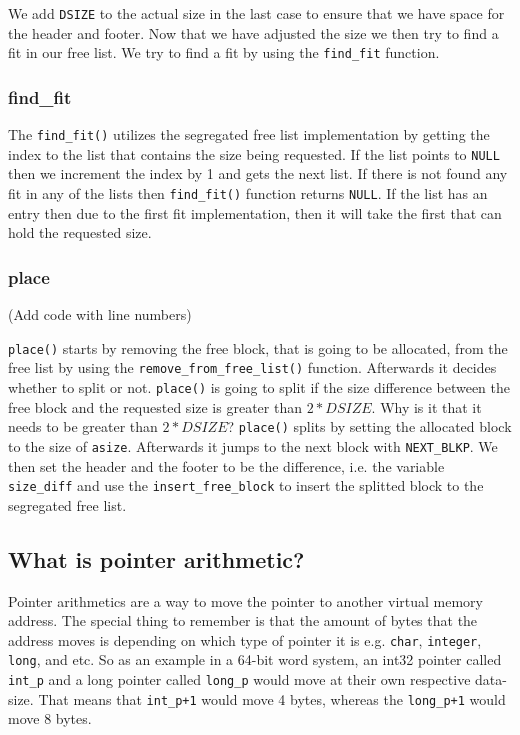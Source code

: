 \documentclass[11pt]{article}
\newcommand{\code}[1]{{\colorbox{lightgray!15}{\color{orange}\texttt{#1}}}}
\newcommand{\temp}[1]{{\color{red}#1}}
\begin{document}
We add \code{DSIZE} to the actual size in the last case to ensure that we have space for the header and footer.
Now that we have adjusted the size we then try to find a fit in our free list. 
We try to find a fit by using the \code{find\_fit} function.

\subsubsection{find\_fit}
The \code{find\_fit()} utilizes the segregated free list implementation by getting the index to the list that contains the size being requested. 
If the list points to \code{NULL} then we increment the index by 1 and gets the next list. 
If there is not found any fit in any of the lists then \code{find\_fit()} function returns \code{NULL}.
If the list has an entry then due to the first fit implementation, then it will take the first that can hold the requested size.

\subsubsection{place}
\temp{(Add code with line numbers)}

\code{place()} starts by removing the free block, that is going to be allocated, from the free list by using the \code{remove\_from\_free\_list()} function. 
Afterwards it decides whether to split or not. \code{place()} is going to split if the size difference between the free block and the requested size is greater than $2 * DSIZE$.
\temp{Why is it that it needs to be greater than $2 * DSIZE$?}
\code{place()} splits by setting the allocated block to the size of \code{asize}. Afterwards it jumps to the next block with \code{NEXT\_BLKP}.
We then set the header and the footer to be the difference, i.e. the variable \code{size\_diff} and use the \code{insert\_free\_block} to insert the splitted block to the segregated free list.

\subsection{What is pointer arithmetic?}
Pointer arithmetics are a way to move the pointer to another virtual memory address. The special thing to remember is that the amount of bytes 
that the address moves is depending on which type of pointer it is e.g. \code{char}, \code{integer}, \code{long}, and etc.
So as an example in a 64-bit word system, an int32 pointer called \code{int\_p} and a long pointer called \code{long\_p} would move at their own respective data-size.
That means that \code{int\_p+1} would move 4 bytes, whereas the \code{long\_p+1} would move 8 bytes.
\end{document}
